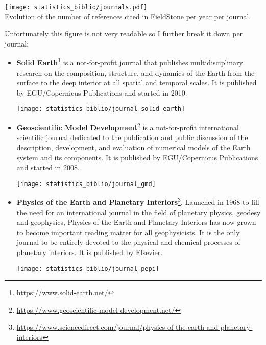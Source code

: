 \begin{center}
\texttt{[image: statistics\_biblio/journals.pdf]}\\
{\captionfont Evolution of the number of references cited in FieldStone
per year per journal.}
\end{center}

Unfortunately this figure is not very readable so I further break it down
per journal:


\begin{itemize}
\item {\bf Solid Earth}\footnote{\url{https://www.solid-earth.net/}}
is a not-for-profit journal that publishes multidisciplinary research on the 
composition, structure, and dynamics of the Earth from the surface to the 
deep interior at all spatial and temporal scales. 
It is published by EGU/Copernicus Publications and started in 2010.

\begin{center}
\texttt{[image: statistics\_biblio/journal\_solid\_earth]}
\end{center}

\item {\bf Geoscientific Model Development}\footnote{\url{https://www.geoscientific-model-development.net/}}
is a not-for-profit international scientific journal dedicated to the publication 
and public discussion of the description, development, and evaluation of numerical models 
of the Earth system and its components.
It is published by EGU/Copernicus Publications and started in 2008.

\begin{center}
\texttt{[image: statistics\_biblio/journal\_gmd]}
\end{center}

\item {\bf Physics of the Earth and Planetary Interiors}\footnote{\url{https://www.sciencedirect.com/journal/physics-of-the-earth-and-planetary-interiors}}.
Launched in 1968 to fill the need for an international journal in the field of 
planetary physics, geodesy and geophysics, Physics of the Earth and Planetary Interiors 
has now grown to become important reading matter for all geophysicists. It is the only 
journal to be entirely devoted to the physical and chemical processes of planetary interiors.
It is published by Elsevier.

\begin{center}
\texttt{[image: statistics\_biblio/journal\_pepi]}
\end{center}


\end{itemize}
